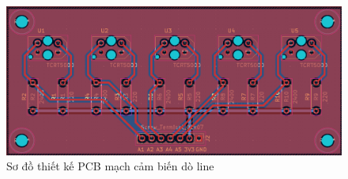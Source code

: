             \begin{figure}[H]
                \centering
                \includegraphics[width=1\textwidth]{pictures/chapter4/c4_p14_SensorPCB.png}
                \caption{Sơ đồ thiết kế PCB mạch cảm biến dò line}
                \label{fig:4-16}
            \end{figure}
